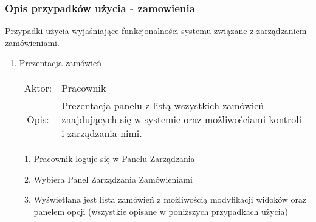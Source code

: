 \subsubsection{Opis przypadków użycia - zamowienia}

Przypadki użycia wyjaśniające funkcjonalności systemu związane z zarządzaniem
zamówieniami.

\begin{enumerate}
  \item Prezentacja zamówień\\
  \begin{tabularx}{\linewidth}{ c X }
  Aktor: & Pracownik \\
  Opis: & Prezentacja panelu z listą wszystkich zamówień znajdujących się w
  systemie oraz możliwościami kontroli i zarządzania nimi.\\
  \end{tabularx}
	\begin{enumerate}
	  \item Pracownik loguje się w Panelu Zarządzania
	  \item Wybiera Panel Zarządzania Zamówieniami
	  \item Wyświetlana jest lista zamówień z możliwością modyfikacji widoków
	  oraz panelem opcji (wszystkie opisane w poniższych przypadkach użycia)
	\end{enumerate}


\end{enumerate}
